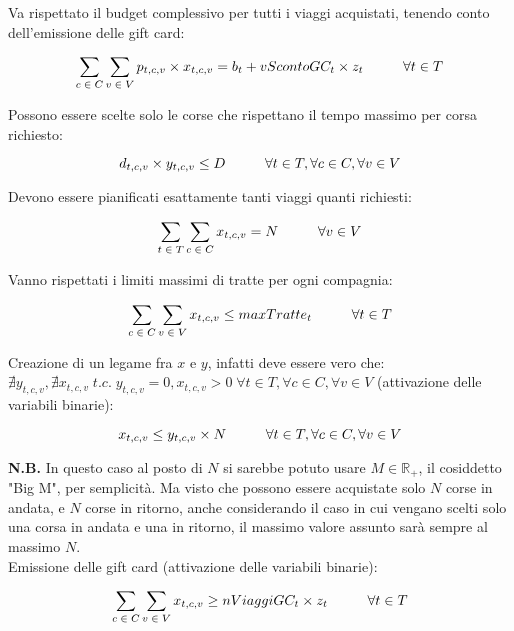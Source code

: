 \documentclass[main.tex]{subfiles}
\begin{document}
Va rispettato il budget complessivo per tutti i viaggi acquistati, tenendo conto dell'emissione delle gift card:
\begin{tcolorbox}
$$\sum_{c\; \in\; C} \sum_{v\; \in\; V} p_{t,c,v} \times{} x_{t,c,v} = b_t + vScontoGC_t \times{} z_t \hspace{10mm} \forall{} t \in T$$
\end{tcolorbox}

Possono essere scelte solo le corse che rispettano il tempo massimo per corsa richiesto:
\begin{tcolorbox}
$$d_{t,c,v} \times{} y_{t,c,v} \leq D \hspace{10mm} \forall{} t \in T, \forall{} c \in C, \forall{} v \in V$$
\end{tcolorbox}

Devono essere pianificati esattamente tanti viaggi quanti richiesti:
\begin{tcolorbox}
$$\sum_{t\; \in\; T} \sum_{c\; \in\; C} x_{t,c,v} = N \hspace{10mm} \forall{} v \in V$$
\end{tcolorbox}

Vanno rispettati i limiti massimi di tratte per ogni compagnia:
\begin{tcolorbox}
$$\sum_{c\; \in\; C} \sum_{v\; \in\; V} x_{t,c,v} \leq maxTratte_t \hspace{10mm} \forall{} t \in T$$
\end{tcolorbox}

Creazione di un legame fra $x$ e $y$, infatti deve essere vero che: $\nexists y_{t,c,v}, \nexists x_{t,c,v}\; t.c.\; y_{t,c,v} = 0, x_{t,c,v} > 0\; \forall{} t \in T, \forall{} c \in C, \forall{} v \in V$ (attivazione delle variabili binarie):
\begin{tcolorbox}
$$x_{t,c,v} \leq y_{t,c,v} \times{} N \hspace{10mm} \forall{} t \in T, \forall{} c \in C, \forall{} v \in V$$
\end{tcolorbox}
\textbf{N.B.} In questo caso al posto di $N$ si sarebbe potuto usare $M \in \mathbb{R}_+$, il cosiddetto "Big M", per semplicità. Ma visto che possono essere acquistate solo $N$ corse in andata, e $N$ corse in ritorno, anche considerando
il caso in cui vengano scelti solo una corsa in andata e una in ritorno, il massimo valore assunto sarà sempre al massimo $N$.\\
Emissione delle gift card (attivazione delle variabili binarie):
\begin{tcolorbox}
$$\sum_{c\; \in\; C} \sum_{v\; \in\; V} x_{t,c,v} \geq nViaggiGC_t \times z_t \hspace{10mm} \forall{} t \in T$$
\end{tcolorbox}
\end{document}
